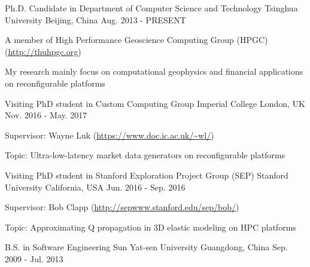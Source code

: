 \documentclass[11pt, a4paper]{awesome-cv}
\begin{document}
\begin{cventries}

  \cventry
    {Ph.D. Candidate in Department of Computer Science and Technology} %
    {Tsinghua University} %
    {Beijing, China} %
    {Aug. 2013 - PRESENT} %
    {
      \begin{cvitems} %
        \item {A member of High Performance Geoscience Computing Group (HPGC) (\url{http://thuhpgc.org})}
        \item {My research mainly focus on computational geophysics and financial applications on reconfigurable platforms}
      \end{cvitems}
    }
    
  \cventry
    {Visiting PhD student in Custom Computing Group} %
    {Imperial College} %
    {London, UK} %
    {Nov. 2016 - May. 2017} %
    {
      \begin{cvitems} %
        \item {Supervisor: Wayne Luk (\url{https://www.doc.ic.ac.uk/~wl/})}      
        \item {Topic: Ultra-low-latency market data generators on reconfigurable platforms}
      \end{cvitems}
    }
    
  \cventry
    {Visiting PhD student in Stanford Exploration Project Group (SEP)} %
    {Stanford University} %
    {California, USA} %
    {Jun. 2016 - Sep. 2016} %
    {
      \begin{cvitems} %
        \item {Supervisor: Bob Clapp (\url{http://sepwww.stanford.edu/sep/bob/})}		
        \item {Topic: Approximating Q propagation in 3D elastic modeling on HPC platforms}
      \end{cvitems}
    }



  \cventry
    {B.S. in Software Engineering} %
    {Sun Yat-sen University} %
    {Guangdong, China} %
    {Sep. 2009 - Jul. 2013} %
    {}
\end{cventries}

\end{document}
